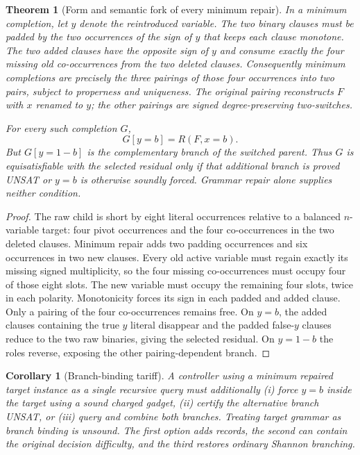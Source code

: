 \documentclass[11pt]{article}
\newtheorem{theorem}{Theorem}
\newtheorem{corollary}{Corollary}
\begin{document}
\begin{theorem}[Form and semantic fork of every minimum repair]
In a minimum completion, let $y$ denote the reintroduced variable.  The two
binary clauses must be padded by the two occurrences of the sign of $y$
that keeps each clause monotone.  The two added clauses have the opposite
sign of $y$ and consume exactly the four missing old co-occurrences from the
two deleted clauses.  Consequently minimum completions are precisely the
three pairings of those four occurrences into two pairs, subject to
properness and uniqueness.  The original pairing reconstructs $F$ with
$x$ renamed to $y$; the other pairings are signed degree-preserving
two-switches.

For every such completion $G$,
\[
G[y=b]=R(F,x=b).
\]
But $G[y=1-b]$ is the complementary branch of the switched parent.  Thus
$G$ is equisatisfiable with the selected residual only if that additional
branch is proved UNSAT or $y=b$ is otherwise soundly forced.  Grammar repair
alone supplies neither condition.
\end{theorem}
\begin{proof}
The raw child is short by eight literal occurrences relative to a balanced
$n$-variable target: four pivot occurrences and the four co-occurrences in
the two deleted clauses.  Minimum repair adds two padding occurrences and
six occurrences in two new clauses.  Every old active variable must regain
exactly its missing signed multiplicity, so the four missing co-occurrences
must occupy four of those eight slots.  The new variable must occupy the
remaining four slots, twice in each polarity.  Monotonicity forces its sign
in each padded and added clause.  Only a pairing of the four co-occurrences
remains free.  On $y=b$, the added clauses containing the true $y$ literal
disappear and the padded false-$y$ clauses reduce to the two raw binaries,
giving the selected residual.  On $y=1-b$ the roles reverse, exposing the
other pairing-dependent branch.
\end{proof}

\begin{corollary}[Branch-binding tariff]
A controller using a minimum repaired target instance as a single recursive
query must additionally (i) force $y=b$ inside the target using a sound
charged gadget, (ii) certify the alternative branch UNSAT, or (iii) query
and combine both branches.  Treating target grammar as branch binding is
unsound.  The first option adds records, the second can contain the original
decision difficulty, and the third restores ordinary Shannon branching.
\end{corollary}
\end{document}
